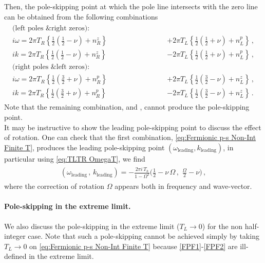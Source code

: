 \documentclass[11pt,a4paper]{article}
\begin{document}
Then, the pole-skipping point at which the pole line intersects with the zero line can be obtained from the following combinations
\begin{align}\label{eq:Fermionic p-s Non-Int Finite T}
\begin{split}
\text{(left poles \& right zeros):}\qquad\qquad\qquad\qquad\qquad \\
i \omega = 2 \pi T_R \left\{ \frac{1}{2} \left(\frac{1}{2} - \nu \right)+n^z_R \right\} &+ 2 \pi T_L \left\{ \frac{1}{2} \left(\frac{1}{2} + \nu \right)+n^p_L \right\}\,,\\
i k = 2 \pi T_R \left\{ \frac{1}{2} \left(\frac{1}{2} - \nu \right)+n^z_R \right\} &- 2 \pi T_L \left\{ \frac{1}{2} \left(\frac{1}{2} + \nu \right)+n^p_L \right\}\,,\\
\text{(right poles \& left zeros):} \qquad\qquad\qquad\qquad\qquad \\
i \omega = 2 \pi T_R \left\{ \frac{1}{2} \left(\frac{3}{2} + \nu \right)+n^p_R \right\} &+ 2 \pi T_L \left\{ \frac{1}{2} \left(\frac{3}{2} - \nu \right)+n^z_L \right\}\,,\\
i k = 2 \pi T_R \left\{ \frac{1}{2} \left(\frac{3}{2} + \nu \right)+n^p_R \right\} &- 2 \pi T_L \left\{ \frac{1}{2} \left(\frac{3}{2} - \nu \right)+n^z_L \right\}\,.
\end{split}
\end{align}
Note that the remaining combination,  and , cannot produce the pole-skipping point.\\


It may be instructive to show the leading pole-skipping point to discuss the effect of rotation.
One can check that the first combination, \eqref{eq:Fermionic p-s Non-Int Finite T}, produces the leading pole-skipping point $(\omega_\text{leading}, k_\text{leading})$, in particular using \eqref{eq:TLTR OmegaT}, we find 
\begin{align}\label{LPSPHERM11}
\begin{split}
(\omega_\text{leading}\,,\, k_\text{leading}) = -\frac{2\pi i \,T_h}{1-\Omega^2}\bigg( \frac{1}{2} - \nu \, \Omega \,,\,\,  \frac{\Omega}{2} - \nu \bigg)\,,
\end{split}
\end{align}
where the correction of rotation $\Omega$ appears both in frequency and wave-vector.


 

\paragraph{Pole-skipping in the extreme limit.}
We also discuss the pole-skipping in the extreme limit ($T_L \rightarrow 0$) for the non half-integer case. Note that such a pole-skipping cannot be achieved simply by taking $T_L \rightarrow 0$ on \eqref{eq:Fermionic p-s Non-Int Finite T} because \eqref{FPF1}-\eqref{FPF2} are ill-defined in the extreme limit.
\end{document}
